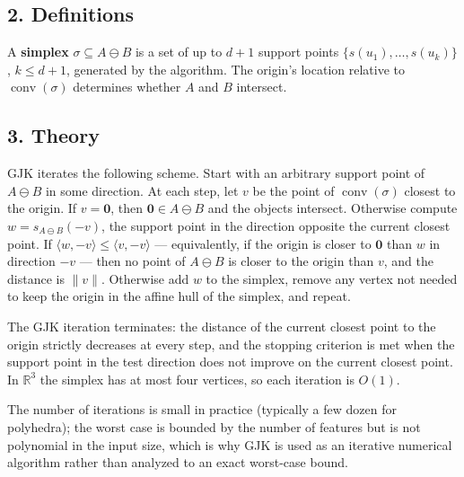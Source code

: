 \subsection{2. Definitions}

\begin{definition}\label{def:convexint_simplex}
  A \textbf{simplex} $\sigma \subseteq A \ominus B$ is a set of up to $d+1$
  support points $\{s(u_1), \dots, s(u_k)\}$, $k \le d+1$, generated by the
  algorithm. The origin's location relative to $\operatorname{conv}(\sigma)$
  determines whether $A$ and $B$ intersect.
\end{definition}

\subsection{3. Theory}

GJK iterates the following scheme. Start with an arbitrary support point of
$A \ominus B$ in some direction. At each step, let $v$ be the point of
$\operatorname{conv}(\sigma)$ closest to the origin. If $v = \mathbf{0}$,
then $\mathbf{0} \in A \ominus B$ and the objects intersect. Otherwise
compute $w = s_{A\ominus B}(-v)$, the support point in the direction
opposite the current closest point. If $\langle w, -v\rangle \le
\langle v, -v\rangle$ --- equivalently, if the origin is closer to
$\mathbf{0}$ than $w$ in direction $-v$ --- then no point of $A \ominus B$
is closer to the origin than $v$, and the distance is $\|v\|$. Otherwise
add $w$ to the simplex, remove any vertex not needed to keep the origin in
the affine hull of the simplex, and repeat.

\begin{theorem}\label{thm:convexint_gjk_term}
  The GJK iteration terminates: the distance of the current closest point
  to the origin strictly decreases at every step, and the stopping
  criterion is met when the support point in the test direction does not
  improve on the current closest point. In $\mathbb{R}^3$ the simplex has
  at most four vertices, so each iteration is $O(1)$.
\end{theorem}

The number of iterations is small in practice (typically a few dozen for
polyhedra); the worst case is bounded by the number of features but is not
polynomial in the input size, which is why GJK is used as an iterative
numerical algorithm rather than analyzed to an exact worst-case bound.

